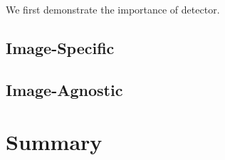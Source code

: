 We first demonstrate the importance of detector.


\subsection{Image-Specific}


\clearpage

\subsection{Image-Agnostic}

\clearpage

\section{Summary}




